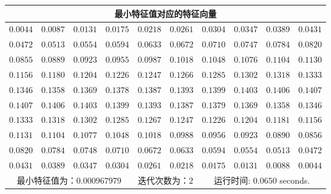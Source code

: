 \documentclass{article}
\begin{document}
\begin{table}[H]
	\centering
	\begin{tabular}{|*{10}{c|}}
		\hline
		\multicolumn{10}{|c|}{最小特征值对应的特征向量} \\ \hline
		$0.0044$ & $0.0087$ & $0.0131$ & $0.0175$ & $0.0218$ & $0.0261$ & $0.0304$ & $0.0347$ & $0.0389$ & $0.0431$ \\ \hline
		$0.0472$ & $0.0513$ & $0.0554$ & $0.0594$ & $0.0633$ & $0.0672$ & $0.0710$ & $0.0747$ & $0.0784$ & $0.0820$ \\ \hline
		$0.0855$ & $0.0889$ & $0.0923$ & $0.0955$ & $0.0987$ & $0.1018$ & $0.1048$ & $0.1076$ & $0.1104$ & $0.1130$ \\ \hline
		$0.1156$ & $0.1180$ & $0.1204$ & $0.1226$ & $0.1247$ & $0.1266$ & $0.1285$ & $0.1302$ & $0.1318$ & $0.1333$ \\ \hline
		$0.1346$ & $0.1358$ & $0.1369$ & $0.1378$ & $0.1387$ & $0.1393$ & $0.1399$ & $0.1403$ & $0.1406$ & $0.1407$ \\ \hline
		$0.1407$ & $0.1406$ & $0.1403$ & $0.1399$ & $0.1393$ & $0.1387$ & $0.1379$ & $0.1369$ & $0.1358$ & $0.1346$ \\ \hline
		$0.1333$ & $0.1318$ & $0.1302$ & $0.1285$ & $0.1267$ & $0.1247$ & $0.1226$ & $0.1204$ & $0.1181$ & $0.1156$ \\ \hline
		$0.1131$ & $0.1104$ & $0.1077$ & $0.1048$ & $0.1018$ & $0.0988$ & $0.0956$ & $0.0923$ & $0.0890$ & $0.0856$ \\ \hline
		$0.0820$ & $0.0784$ & $0.0748$ & $0.0710$ & $0.0672$ & $0.0633$ & $0.0594$ & $0.0554$ & $0.0513$ & $0.0472$ \\ \hline
		$0.0431$ & $0.0389$ & $0.0347$ & $0.0304$ & $0.0261$ & $0.0218$ & $0.0175$ & $0.0131$ & $0.0088$ & $0.0044$ \\ \hline
		\multicolumn{4}{|c|}{最小特征值为：$0.000967979$} & \multicolumn{2}{c|}{迭代次数为：$2$} & \multicolumn{4}{c|}{运行时间: $0.0650$ seconds.} \\ \hline
	\end{tabular}
\end{table}
\end{document}
